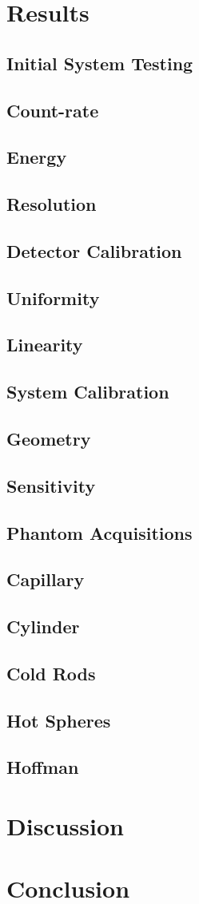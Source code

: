 \section{Results}
\subsection{Initial System Testing}
\subsection{Count-rate} 
\subsection{Energy}
\subsection{Resolution}
\subsection{Detector Calibration}
\subsection{Uniformity}
\subsection{Linearity} 
\subsection{System Calibration}
\subsection{Geometry}
\subsection{Sensitivity}
\subsection{Phantom Acquisitions}
\subsection{Capillary}
\subsection{Cylinder}
\subsection{Cold Rods}
\subsection{Hot Spheres} 
\subsection{Hoffman}

\section{Discussion}

\section{Conclusion}